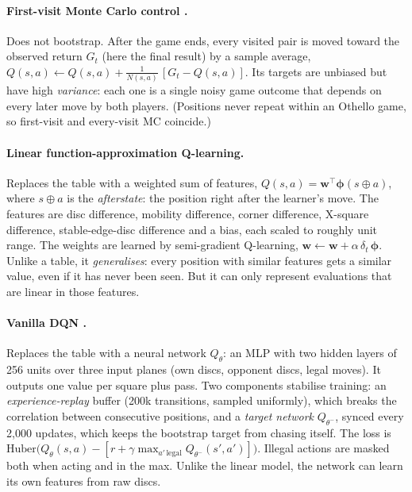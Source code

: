 \documentclass[11pt]{article}
\begin{document}
\paragraph{First-visit Monte Carlo control \cite{sutton2018}.} Does not
bootstrap. After the game ends, every visited pair is moved toward the observed
return $G_t$ (here the final result) by a sample average,
$Q(s,a)\leftarrow Q(s,a) + \tfrac{1}{N(s,a)}\,[G_t - Q(s,a)]$. Its targets are
unbiased but have high \emph{variance}: each one is a single noisy game outcome
that depends on every later move by both players. (Positions never repeat within
an Othello game, so first-visit and every-visit MC coincide.)

\paragraph{Linear function-approximation Q-learning.} Replaces the table with a
weighted sum of features, $Q(s,a)=\mathbf{w}^{\top}\boldsymbol{\phi}(s\!\oplus\!a)$,
where $s\!\oplus\!a$ is the \emph{afterstate}: the position right after the
learner's move. The features are disc difference, mobility difference, corner
difference, X-square difference, stable-edge-disc difference and a bias, each
scaled to roughly unit range. The weights are learned by semi-gradient
Q-learning, $\mathbf{w} \leftarrow \mathbf{w} + \alpha\,\delta_t\,\boldsymbol{\phi}$.
Unlike a table, it \emph{generalises}: every position with similar features gets a
similar value, even if it has never been seen. But it can only represent
evaluations that are linear in those features.

\paragraph{Vanilla DQN \cite{mnih2015}.} Replaces the table with a neural network
$Q_\theta$: an MLP with two hidden layers of 256 units over three input planes
(own discs, opponent discs, legal moves). It outputs one value per square plus
pass. Two components stabilise training:
an \emph{experience-replay} buffer (200k transitions, sampled uniformly), which
breaks the correlation between consecutive positions, and a \emph{target
network} $Q_{\theta^-}$, synced every 2{,}000 updates, which keeps the bootstrap
target from chasing itself. The loss is
$\mathrm{Huber}\big(Q_\theta(s,a) - [r + \gamma\max_{a'\,\text{legal}} Q_{\theta^-}(s',a')]\big)$.
Illegal actions are masked both when acting and in the max. Unlike the linear
model, the network can learn its own features from raw discs.
\end{document}
